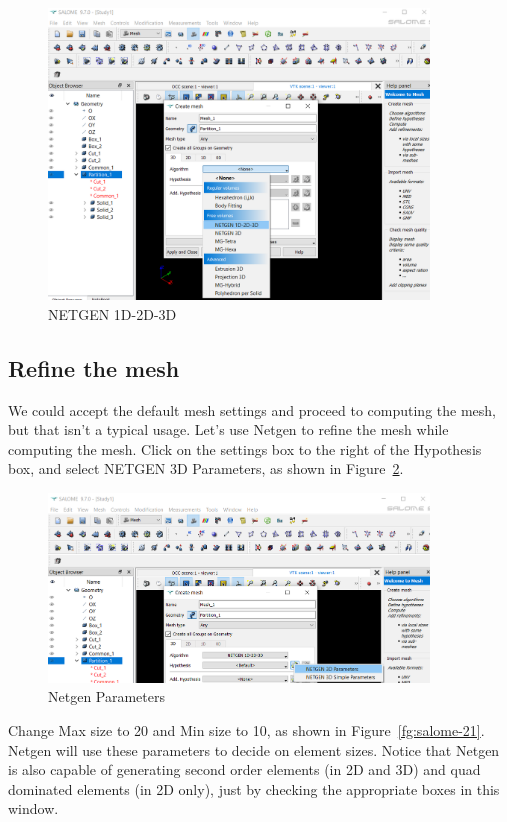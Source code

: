 \begin{figure}[H]
\centering
\includegraphics[width=0.9\textwidth]{Salome-19}
\caption{NETGEN 1D-2D-3D}\label{fg:salome-19}
\end{figure}

\subsection{Refine the mesh}

We could accept the default mesh settings and proceed to computing the mesh, but that isn't a typical usage.  Let's use Netgen to refine the mesh while computing the mesh.  Click on the settings box to the right of the Hypothesis box, and select NETGEN 3D Parameters, as shown in Figure~\ref{fg:salome-20}.

\begin{figure}[H]
\centering
\includegraphics[width=0.9\textwidth]{Salome-20}
\caption{Netgen Parameters}\label{fg:salome-20}
\end{figure}

Change Max size to 20 and Min size to 10, as shown in Figure~\ref{fg:salome-21}.  Netgen will use these parameters to decide on element sizes.  Notice that Netgen is also capable of generating second order elements (in 2D and 3D) and quad dominated elements (in 2D only), just by checking the appropriate boxes in this window.\\

